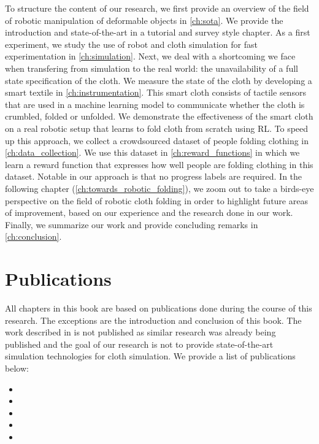 \documentclass[\home/main.tex]{subfiles}
\begin{document}
To structure the content of our research, we first provide an overview of the field of robotic manipulation of deformable objects in \cref{ch:sota}. We provide the introduction and state-of-the-art in a tutorial and survey style chapter. As a first experiment, we study the use of robot and cloth simulation for fast experimentation in \cref{ch:simulation}. Next, we deal with a shortcoming we face when transfering from simulation to the real world: the unavailability of a full state specification of the cloth. We measure the state of the cloth by developing a smart textile in \cref{ch:instrumentation}. This smart cloth consists of tactile sensors that are used in a machine learning model to communicate whether the cloth is crumbled, folded or unfolded. We demonstrate the effectiveness of the smart cloth on a real robotic setup that learns to fold cloth from scratch using RL. To speed up this approach, we collect a crowdsourced dataset of people folding clothing in \cref{ch:data_collection}. We use this dataset in \cref{ch:reward_functions} in which we learn a reward function that expresses how well people are folding clothing in this dataset. Notable in our approach is that no progress labels are required.
In the following chapter (\cref{ch:towards_robotic_folding}), we zoom out to take a birds-eye perspective on the field of robotic cloth folding in order to highlight future areas of improvement, based on our experience and the research done in our work.
Finally, we summarize our work and provide concluding remarks in \cref{ch:conclusion}.

\section{Publications}
All chapters in this book are based on publications done during the course of this research. The exceptions are the introduction and conclusion of this book. The work described in  is not published as similar research was already being published and the goal of our research is not to provide state-of-the-art simulation technologies for cloth simulation. We provide a list of publications below:
\begin{itemize}
    \item {}
    \item {}
    \item {}
    \item {}
    \item {}
\end{itemize}
\end{document}
